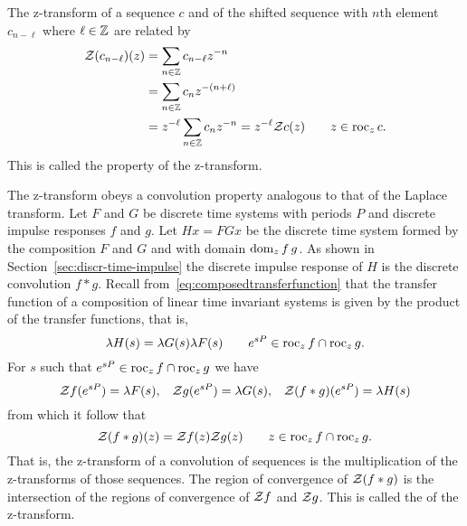 The z-transform of a sequence $c$ and of the shifted sequence with $n$th element $c_{n-\ell}$ where $\ell \in {\mathbb Z}$ are related by
\begin{align}
{\mathcal Z}(c_{n-\ell})(z) &= \sum_{n \in {\mathbb Z}} c_{n-\ell} z^{-n} \nonumber \\
&= \sum_{n \in {\mathbb Z}} c_{n} z^{-(n+\ell)} \nonumber \\
&= z^{-\ell} \sum_{n \in {\mathbb Z}} c_n z^{-n} = z^{-\ell} {\mathcal Z} c(z) \qquad z \in \operatorname{roc}_z c. \label{eq:timeshiftpropertyztransform}
\end{align}
This is called the  property of the z-transform.   %

The z-transform obeys a convolution property analogous to that of the Laplace transform.  Let $F$ and $G$ be discrete time systems with periods $P$ and discrete impulse responses $f$ and $g$.  Let $H x = F G x$ be the discrete time system formed by the composition $F$ and $G$ and with domain $\operatorname{dom}_z f\,g$.  As shown in Section~\ref{sec:discr-time-impulse} the discrete impulse response of $H$ is the discrete convolution $f * g$.  Recall from~\eqref{eq:composedtransferfunction} that the transfer function of a composition of linear time invariant systems is given by the product of the transfer functions, that is,
\[
\lambda H(s)  = \lambda G(s) \lambda F(s) \qquad e^{sP} \in \operatorname{roc}_z f \cap \operatorname{roc}_z g.
\]
For $s$ such that $e^{sP} \in \operatorname{roc}_z f \cap \operatorname{roc}_z g$ we have
\[
{\mathcal Z} f(e^{sP}) = \lambda F(s) , \;\;\; {\mathcal Z} g(e^{sP}) = \lambda G(s), \;\;\; {\mathcal Z}(f * g)(e^{sP}) = \lambda H(s)
\]
from which it follow that
\[
{\mathcal Z}( f * g)(z) = {\mathcal Z} f(z) {\mathcal Z} g(z) \qquad z \in \operatorname{roc}_z f \cap \operatorname{roc}_z g.
\]
That is, the z-transform of a convolution of sequences is the multiplication of the z-transforms of those sequences.  The region of convergence of ${\mathcal Z}(f*g)$ is the intersection of the regions of convergence of ${\mathcal Z} f$ and ${\mathcal Z} g$.  This is called the  of the z-transform.

